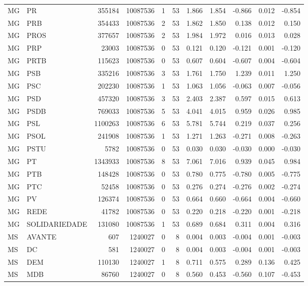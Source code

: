 \begin{landscape}
\begin{longtable}{llrrrrrrrrr}
MG & PR & 355184 & 10087536 & 1 & 53 & 1.866 & 1.854 & -0.866 & 0.012 & -0.854 \\
MG & PRB & 354433 & 10087536 & 2 & 53 & 1.862 & 1.850 & 0.138 & 0.012 & 0.150 \\
MG & PROS & 377657 & 10087536 & 2 & 53 & 1.984 & 1.972 & 0.016 & 0.013 & 0.028 \\
MG & PRP & 23003 & 10087536 & 0 & 53 & 0.121 & 0.120 & -0.121 & 0.001 & -0.120 \\
MG & PRTB & 115623 & 10087536 & 0 & 53 & 0.607 & 0.604 & -0.607 & 0.004 & -0.604 \\
MG & PSB & 335216 & 10087536 & 3 & 53 & 1.761 & 1.750 & 1.239 & 0.011 & 1.250 \\
MG & PSC & 202230 & 10087536 & 1 & 53 & 1.063 & 1.056 & -0.063 & 0.007 & -0.056 \\
MG & PSD & 457320 & 10087536 & 3 & 53 & 2.403 & 2.387 & 0.597 & 0.015 & 0.613 \\
MG & PSDB & 769033 & 10087536 & 5 & 53 & 4.041 & 4.015 & 0.959 & 0.026 & 0.985 \\
MG & PSL & 1100263 & 10087536 & 6 & 53 & 5.781 & 5.744 & 0.219 & 0.037 & 0.256 \\
MG & PSOL & 241908 & 10087536 & 1 & 53 & 1.271 & 1.263 & -0.271 & 0.008 & -0.263 \\
MG & PSTU & 5782 & 10087536 & 0 & 53 & 0.030 & 0.030 & -0.030 & 0.000 & -0.030 \\
MG & PT & 1343933 & 10087536 & 8 & 53 & 7.061 & 7.016 & 0.939 & 0.045 & 0.984 \\
MG & PTB & 148428 & 10087536 & 0 & 53 & 0.780 & 0.775 & -0.780 & 0.005 & -0.775 \\
MG & PTC & 52458 & 10087536 & 0 & 53 & 0.276 & 0.274 & -0.276 & 0.002 & -0.274 \\
MG & PV & 126374 & 10087536 & 0 & 53 & 0.664 & 0.660 & -0.664 & 0.004 & -0.660 \\
MG & REDE & 41782 & 10087536 & 0 & 53 & 0.220 & 0.218 & -0.220 & 0.001 & -0.218 \\
MG & SOLIDARIEDADE & 131080 & 10087536 & 1 & 53 & 0.689 & 0.684 & 0.311 & 0.004 & 0.316 \\
MS & AVANTE & 607 & 1240027 & 0 & 8 & 0.004 & 0.003 & -0.004 & 0.001 & -0.003 \\
MS & DC & 581 & 1240027 & 0 & 8 & 0.004 & 0.003 & -0.004 & 0.001 & -0.003 \\
MS & DEM & 110130 & 1240027 & 1 & 8 & 0.711 & 0.575 & 0.289 & 0.136 & 0.425 \\
MS & MDB & 86760 & 1240027 & 0 & 8 & 0.560 & 0.453 & -0.560 & 0.107 & -0.453 \\

\end{longtable}
\end{landscape}
